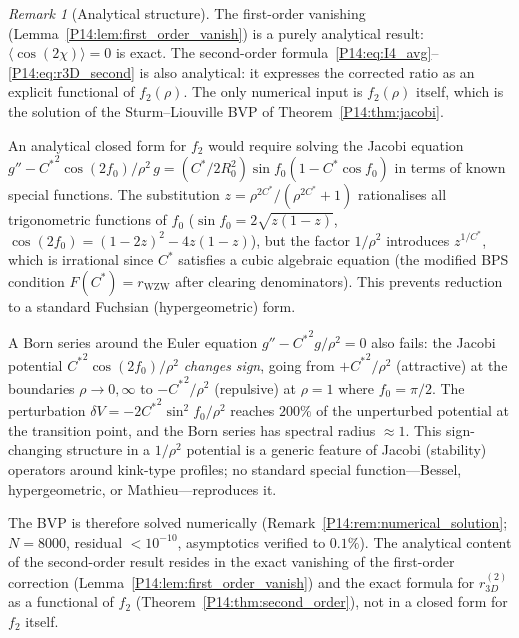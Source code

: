 \documentclass[11pt,a4paper]{article}
\theoremstyle{definition}
\theoremstyle{remark}
\newtheorem{remark}[theorem]{Remark}
\newcommand{\Cstar}{C^*}
\newcommand{\fzero}{f_0}
\newcommand{\ftwo}{f_2}
\newcommand{\Rzero}{R_0}
\begin{document}
\begin{remark}[Analytical structure]
\label{P14:rem:analytical_structure}
The first-order vanishing (Lemma~\ref{P14:lem:first_order_vanish}) is a
purely analytical result: $\langle\cos(2\chi)\rangle = 0$ is exact.
The second-order formula~\eqref{P14:eq:I4_avg}--\eqref{P14:eq:r3D_second}
is also analytical: it expresses the corrected ratio as an explicit
functional of $\ftwo(\rho)$.  The only numerical input is
$\ftwo(\rho)$ itself, which is the solution of the Sturm--Liouville
BVP of Theorem~\ref{P14:thm:jacobi}.

An analytical closed form for $\ftwo$ would require solving the
Jacobi equation
$g'' - {\Cstar}^2\cos(2\fzero)/\rho^2\,g
= (\Cstar/2\Rzero^2)\sin\fzero(1-\Cstar\cos\fzero)$
in terms of known special functions.
The substitution $z = \rho^{2\Cstar}/(\rho^{2\Cstar}+1)$
rationalises all trigonometric functions of $\fzero$
($\sin\fzero = 2\sqrt{z(1-z)}$, $\cos(2\fzero) = (1-2z)^2 - 4z(1-z)$),
but the factor $1/\rho^2$ introduces $z^{1/\Cstar}$, which is
irrational since $\Cstar$ satisfies a cubic algebraic equation
(the modified BPS condition $F(\Cstar)=r_{\mathrm{WZW}}$
after clearing denominators).
This prevents reduction to a standard Fuchsian (hypergeometric) form.

A Born series around the Euler equation
$g''-{\Cstar}^2 g/\rho^2 = 0$ also fails:
the Jacobi potential ${\Cstar}^2\cos(2\fzero)/\rho^2$ \emph{changes sign},
going from $+{\Cstar}^2/\rho^2$ (attractive) at the boundaries
$\rho\to0,\infty$ to $-{\Cstar}^2/\rho^2$ (repulsive) at
$\rho = 1$ where $\fzero = \pi/2$.  The perturbation
$\delta V = -2{\Cstar}^2\sin^2\!\fzero/\rho^2$ reaches $200\%$ of the
unperturbed potential at the transition point, and the Born series
has spectral radius $\approx 1$.
This sign-changing structure in a $1/\rho^2$ potential is a generic
feature of Jacobi (stability) operators around kink-type profiles;
no standard special function---Bessel, hypergeometric, or
Mathieu---reproduces it.

The BVP is therefore solved numerically
(Remark~\ref{P14:rem:numerical_solution}; $N=8000$,
residual $<10^{-10}$, asymptotics verified to $0.1\%$).
The analytical content of the second-order result resides in
the exact vanishing of the first-order correction
(Lemma~\ref{P14:lem:first_order_vanish}) and the exact formula
for $r_{3D}^{(2)}$ as a functional of $\ftwo$
(Theorem~\ref{P14:thm:second_order}), not in a closed form
for $\ftwo$ itself.
\end{remark}
\end{document}
